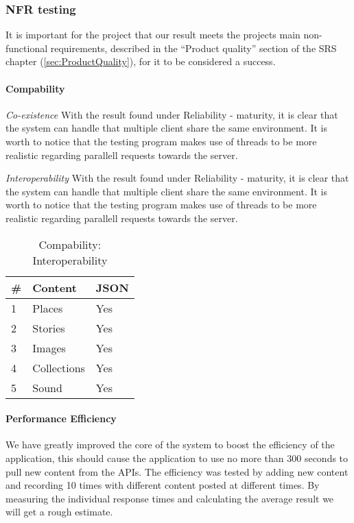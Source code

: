 \subsubsection{NFR testing}
It is important for the project that our result meets the projects main non-functional requirements, described in the ``Product quality'' section of the SRS chapter (\ref{sec:ProductQuality}), for it to be considered a success. 

\paragraph{Compability}

\emph{Co-existence}
With the result found under Reliability - maturity, it is clear that the system can handle  that multiple client share the same environment. It is worth to notice that the testing program makes use of threads to be more realistic regarding parallell requests towards the server.

\emph{Interoperability}
With the result found under Reliability - maturity, it is clear that the system can handle  that multiple client share the same environment. It is worth to notice that the testing program makes use of threads to be more realistic regarding parallell requests towards the server.

\begin{table}[!htp]
\begin{center}
	\begin{tabular}{ | l | l | l | }
	\hline
	 \#	 	& Content 		& JSON 	\\ \hline
	 1		&Places		& Yes	\\ \hline
	 2		&Stories		& Yes	\\ \hline
	 3		&Images		& Yes	\\ \hline
	 4		&Collections	& Yes	\\ \hline
	 5		&Sound		& Yes 	\\
	 \hline
 	 \end{tabular}
\end{center}
\caption{Compability: Interoperability}
\label{tab:Compability: Interoperabilityt}
\end{table}

\paragraph{Performance Efficiency}
We have greatly improved the core of the system to boost the efficiency of the application, this should cause the application to use no more than 300 seconds to pull new content from the APIs. The efficiency was tested by adding new content and recording 10 times with different content posted at different times. By measuring the individual response times and calculating the average result we will get a rough estimate.\\

